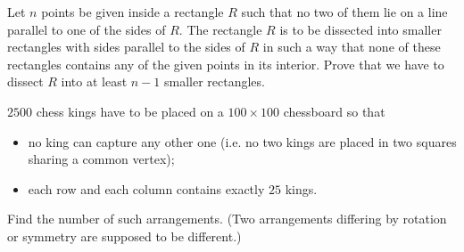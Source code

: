 

%



\renewcommand{\theenumi}{\alph{enumi}}



\noindent
 
\filbreak


\begin{problem}

Let $n$ points be given inside a rectangle $R$ such that no two of them lie on a line parallel to one of the sides of $R$. The rectangle $R$ is to be dissected into smaller rectangles with sides parallel to the sides of $R$ in such a way that none of these rectangles contains any of the given points in its interior. Prove that we have to dissect $R$ into at least $n - 1$ smaller rectangles.


\end{problem}

\begin{problem}

$2500$ chess kings have to be placed on a $100\times 100$ chessboard so that
\begin{itemize}
\item no king can capture any other one (i.e. no two kings are placed in two squares sharing a common vertex);
\item each row and each column contains exactly $25$ kings.
\end{itemize}
Find the number of such arrangements. (Two arrangements differing by rotation or symmetry are supposed to be different.)


\end{problem}


